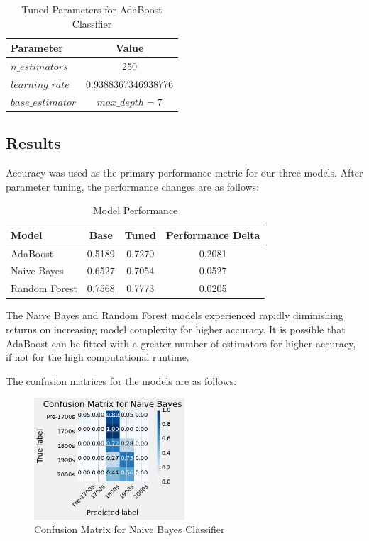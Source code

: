\documentclass{article}
\begin{document}
\begin{table}[ht]
\centering
\caption{Tuned Parameters for AdaBoost Classifier}
\begin{tabular}{l|c}
\toprule
Parameter & Value \\
\midrule
$n\_estimators$ & 250 \\
$learning\_rate$ & 0.9388367346938776 \\
$base\_estimator$ & $max\_depth=7$ \\
\bottomrule
\end{tabular}
\end{table}

\subsection{Results}

Accuracy was used as the primary performance metric for our three models. After parameter
tuning, the performance changes are as follows:

\begin{table}[ht]
\centering
\caption{Model Performance}
\begin{tabular}{l|c|c|c}
\toprule
Model & Base & Tuned & Performance Delta \\
\midrule
AdaBoost & 0.5189 & 0.7270 & 0.2081 \\
Naive Bayes & 0.6527 & 0.7054 & 0.0527 \\
Random Forest & 0.7568 & 0.7773 & 0.0205 \\
\bottomrule
\end{tabular}
\end{table}

The Naive Bayes and Random Forest models experienced rapidly diminishing returns on increasing
model complexity for higher accuracy. It is possible that AdaBoost can be fitted with a greater
number of estimators for higher accuracy, if not for the high computational runtime.

The confusion matrices for the models are as follows:

\begin{figure}[h]
  \centering
  \includegraphics[width=0.5\textwidth]{cm_nb.png}
  \caption{Confusion Matrix for Naive Bayes Classifier}
  \end{figure}
\end{document}
